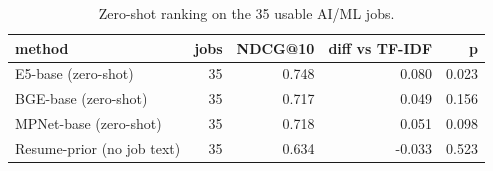 \begin{table}
\caption{Zero-shot ranking on the 35 usable AI/ML jobs.}
\label{tab:t9_ai_jobs}
\begin{tabular}{lrrrr}
\toprule
method & jobs & NDCG@10 & diff vs TF-IDF & p \\
\midrule
E5-base (zero-shot) & 35 & 0.748 & 0.080 & 0.023 \\
BGE-base (zero-shot) & 35 & 0.717 & 0.049 & 0.156 \\
MPNet-base (zero-shot) & 35 & 0.718 & 0.051 & 0.098 \\
Resume-prior (no job text) & 35 & 0.634 & -0.033 & 0.523 \\
\bottomrule
\end{tabular}
\end{table}
